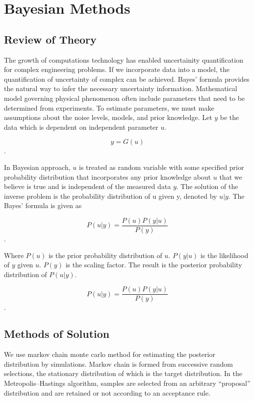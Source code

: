 \chapter{Bayesian Methods}\label{chap:bayes}
\section{Review of Theory}

The growth of computations technology has enabled uncertainity quantification for complex engineering problems. If we  incorporate data into a model, the quantification of uncertainty of complex can be achieved. Bayes' formula provides the natural way to infer the necessary uncertainty information. Mathematical model governing physical phenomenon often include parameters that need to be determined from experiments. To estimate parameters, we must make assumptions about the noise levels, models, and prior knowledge. Let $y$ be the data which is dependent on independent parameter $u$. 

$$y = G(u)$$. 

\noindent  In Bayesian approach, $u$ is treated as random variable with some specified prior probability distribution that incorporates any prior knowledge about $u$ that we believe is true and is independent of the measured data $y$. The solution of the inverse problem is the probability distribution of u given y, denoted by $u|y$. The Bayes' formula is given as 

$$P(u|y) = \frac{P(u) P(y|u)}{P(y)}$$ .
 
 \bigskip
 
\noindent Where $P(u)$ is the prior probability distribution of $u$. $P(y|u)$ is the likelihood of $y$ given $u$. $P(y)$ is the scaling factor. 
 \noindent The result is the posterior probability distribution of $P(u|y)$.
 
$$P(u|y) = \frac{P(u) P(y|u)}{P(y)}$$ .

\section{Methods of Solution}

\noindent We use markov chain monte carlo method for estimating the posterior distribution by simulations. Markov chain is formed from successive random selections, the stationary distribution of which is the target distribution. In the Metropolis–Hastings algorithm, samples are selected from an arbitrary “proposal” distribution and are retained or not according to an acceptance rule. 


